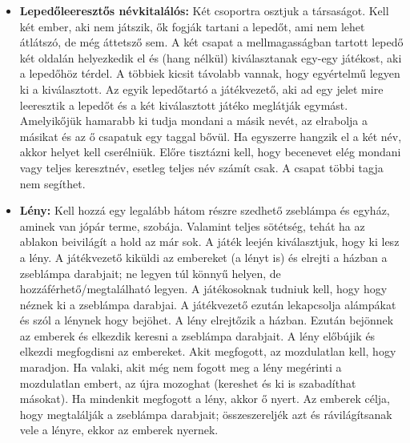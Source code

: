 \documentclass[a4paper, 12pt, twoside, openright]{article}
\begin{document}
\begin{itemize}
\item \textbf{Lepedőleeresztős névkitalálós:} Két csoportra osztjuk a társaságot. Kell két ember, aki nem játszik, ők fogják tartani a lepedőt, ami nem lehet átlátszó, de még áttetsző sem. A két csapat a mellmagasságban tartott lepedő két oldalán helyezkedik el és (hang nélkül) kiválasztanak egy-egy játékost, aki a lepedőhöz térdel. A többiek kicsit távolabb vannak, hogy egyértelmű legyen ki a kiválasztott. Az egyik lepedőtartó a játékvezető, aki ad egy jelet mire leeresztik a lepedőt és a két kiválasztott játéko meglátják egymást. Amelyikőjük hamarabb ki tudja mondani a másik nevét, az elrabolja a másikat és az ő csapatuk egy taggal bővül. Ha egyszerre hangzik el a két név, akkor helyet kell cserélniük. Előre tisztázni kell, hogy becenevet elég mondani vagy teljes keresztnév, esetleg teljes név számít csak. A csapat többi tagja nem segíthet.

\item \textbf{Lény:} Kell hozzá egy legalább hátom részre szedhető zseblámpa és egyház, aminek van jópár terme, szobája. Valamint teljes sötétség, tehát ha az ablakon beivilágít a hold az már sok. A játék leején kiválasztjuk, hogy ki lesz a lény. A játékvezető kiküldi az embereket (a lényt is) és elrejti a házban a zseblámpa darabjait; ne legyen túl könnyű helyen, de hozzáférhető/megtalálható legyen. A játékosoknak tudniuk kell, hogy hogy néznek ki a zseblámpa darabjai. A játékvezető ezután lekapcsolja alámpákat és szól a lénynek hogy bejöhet. A lény elrejtőzik a házban. Ezután bejönnek az emberek és elkezdik keresni a zseblámpa darabjait. A lény előbújik és elkezdi megfogdisni az embereket. Akit megfogott, az mozdulatlan kell, hogy maradjon. Ha valaki, akit még nem fogott meg a lény megérinti a mozdulatlan embert, az újra mozoghat (kereshet és ki is szabadíthat másokat). Ha mindenkit megfogott a lény, akkor ő nyert. Az emberek célja, hogy megtalálják a zseblámpa darabjait; összeszereljék azt és rávilágítsanak vele a lényre, ekkor az emberek nyernek.


\end{itemize}
\end{document}
